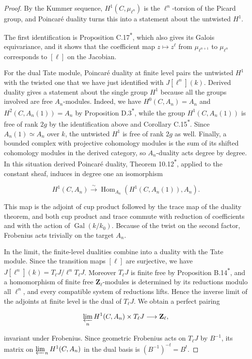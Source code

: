 \documentclass[11pt]{article}
\newcommand{\bpout}[1]{#1\textsuperscript{\hyperlink{bp-outside}{\ensuremath{\ast}}}}
\providecommand{\Hom}{}\renewcommand{\Hom}{\operatorname{Hom}}
\begin{document}
\begin{proof}[{Proof}]\label{bp11}%
By the Kummer sequence, \(H^1(C,\mu_{\ell^n})\) is the \(\ell^n\)-torsion of the Picard group, and Poincaré duality turns this into a statement about the untwisted \(H^1\).

The first identification is Proposition \bpout{C.17}, which also gives its Galois equivariance, and it shows that the coefficient map \(z\mapsto z^\ell\) from \(\mu_{\ell^{n+1}}\) to \(\mu_{\ell^n}\) corresponds to \([\ell]\) on the Jacobian.

For the dual Tate module, Poincaré duality at finite level pairs the untwisted \(H^1\) with the twisted one that we have just identified with \(J[\ell^n](k)\). Derived duality gives a statement about the single group \(H^1\) because all the groups involved are free \(A_n\)-modules. Indeed, we have \(H^0(C,A_n)=A_n\) and \(H^2(C,A_n(1))=A_n\) by Proposition \bpout{D.3}, while the group \(H^1(C,A_n(1))\) is free of rank \(2g\) by the identification above and Corollary \bpout{C.15}. Since \(A_n(1)\simeq A_n\) over \(k\), the untwisted \(H^1\) is free of rank \(2g\) as well. Finally, a bounded complex with projective cohomology modules is the sum of its shifted cohomology modules in the derived category, so \(A_n\)-duality acts degree by degree. In this situation derived Poincaré duality, Theorem \bpout{10.12}, applied to the constant sheaf, induces in degree one an isomorphism

\[
H^1(C,A_n)\xrightarrow{\sim}
\Hom_{A_n}(H^1(C,A_n(1)),A_n).
\]

This map is the adjoint of cup product followed by the trace map of the duality theorem, and both cup product and trace commute with reduction of coefficients and with the action of \(\operatorname{Gal}(k/k_0)\).  Because of the twist on the second factor, Frobenius acts trivially on the target \(A_n\).

In the limit, the finite-level dualities combine into a duality with the Tate module. Since the transition maps \([\ell]\) are surjective, we have \(J[\ell^n](k)=T_\ell J/\ell^nT_\ell J\). Moreover \(T_\ell J\) is finite free by Proposition \bpout{B.14}, and a homomorphism of finite free \(\mathbf Z_\ell\)-modules is determined by its reductions modulo all \(\ell^n\), and every compatible system of reductions lifts. Hence the inverse limit of the adjoints at finite level is the dual of \(T_\ell J\). We obtain a perfect pairing

\[
\varprojlim_nH^1(C,A_n)\times T_\ell J\longrightarrow\mathbf Z_\ell,
\]

invariant under Frobenius.  Since geometric Frobenius acts on \(T_\ell J\) by \(B^{-1}\), its matrix on \(\varprojlim_nH^1(C,A_n)\) in the dual basis is \((B^{-1})^{-t}=B^t\).
\end{proof}
\end{document}
